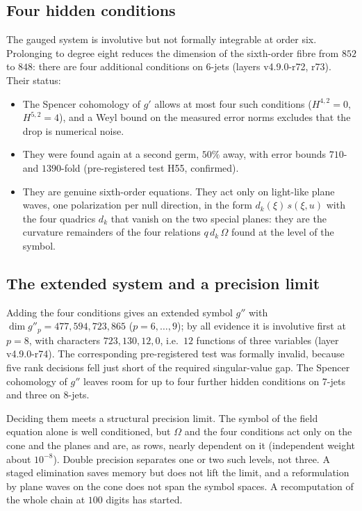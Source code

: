 \subsection{Four hidden conditions}

The gauged system is involutive but not formally integrable at order six.  Prolonging to degree eight reduces the dimension of the
sixth-order fibre from \(852\) to \(848\): there are four additional conditions on 6-jets (layers v4.9.0-r72, r73).  Their status:
\begin{itemize}
\item The Spencer cohomology of \(g'\) allows at most four such conditions (\(H^{4,2}=0\), \(H^{5,2}=4\)), and a Weyl bound on the measured
error norms excludes that the drop is numerical noise.
\item They were found again at a second germ, \(50\%\) away, with error bounds \(710\)- and \(1390\)-fold (pre-registered test H55,
confirmed).
\item They are genuine sixth-order equations.  They act only on light-like plane waves, one polarization per null direction, in the
form \(d_k(\xi)\,s(\xi,u)\) with the four quadrics \(d_k\) that vanish on the two special planes: they are the curvature remainders of the
four relations \(q\,d_k\,\Omega\) found at the level of the symbol.
\end{itemize}

\subsection{The extended system and a precision limit}

Adding the four conditions gives an extended symbol \(g''\) with
\(\dim g''_p=477,594,723,865\) (\(p=6,\dots,9\)); by all evidence it is involutive first at \(p=8\), with characters \(723,130,12,0\), i.e.\
\(12\) functions of three variables (layer v4.9.0-r74).  The corresponding pre-registered test was formally invalid, because five rank
decisions fell just short of the required singular-value gap.  The Spencer cohomology of \(g''\) leaves room for up to four further
hidden conditions on 7-jets and three on 8-jets.

Deciding them meets a structural precision limit.  The symbol of the field equation alone is well conditioned, but \(\Omega\) and the
four conditions act only on the cone and the planes and are, as rows, nearly dependent on it (independent weight about \(10^{-8}\)).
Double precision separates one or two such levels, not three.  A staged elimination saves memory but does not lift the limit, and a
reformulation by plane waves on the cone does not span the symbol spaces.  A recomputation of the whole chain at \(100\) digits has
started.

